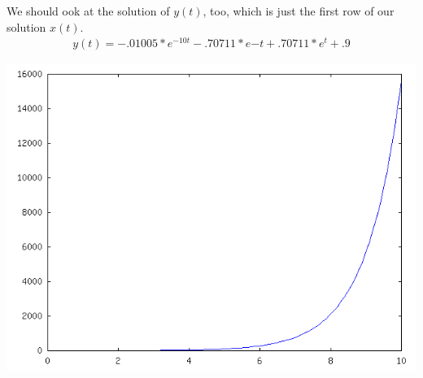 \documentclass[11pt]{article}
\begin{document}
We should ook at the solution of $y(t)$, too, which is just
the first row of our solution $x(t)$.
\begin{align*}
    y(t) = -.01005*e^{-10t}-.70711*e{-t}+.70711*e^{t}+.9
\end{align*}

\begin{center}
\includegraphics[scale=0.5]{problem_19_17.png}
\end{center}

%
\end{document}
